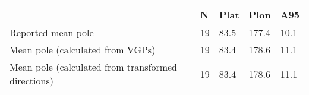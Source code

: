 \begin{tabular}{lllll}
\toprule
{} &   N &  Plat &   Plon &   A95 \\
\midrule
Reported mean pole                                 &  19 &  83.5 &  177.4 &  10.1 \\
Mean pole (calculated from VGPs)                   &  19 &  83.4 &  178.6 &  11.1 \\
Mean pole (calculated from transformed directions) &  19 &  83.4 &  178.6 &  11.1 \\
\bottomrule
\end{tabular}

